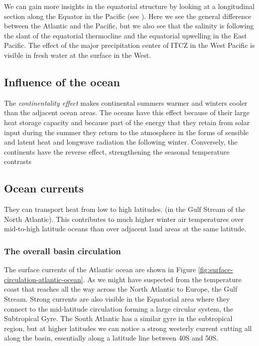 We can gain more insights in the equatorial structure by looking at a
longitudinal section along the Equator in the Pacific (see \fig{\ref{fig:salinity-vertical-equator}}). Here we see the general difference between the
Atlantic and the Pacific, but we also see that the salinity is following
the slant of the equatorial thermocline and the equatorial upwelling in
the East Pacific. The effect of the major precipitation center of ITCZ
in the West Pacific is visible in fresh water at the surface in the
West.

\subsection{Influence of the ocean}\label{subsec:ocean-influence}

The \emph{continentality effect} makes continental summers warmer and winters cooler than the adjacent ocean areas.
The oceans have this effect because of their large heat storage capacity and because part of the energy that they retain from
solar input during the summer they return to the atmosphere in the forms of sensible and latent heat and longwave radiation the following winter.
Conversely, the continents have the reverse effect, strengthening the seasonal temperature contrasts

\subsection{Ocean currents}\label{subsec:ocean-currents}

They can transport heat from low to high latitudes. (in the Gulf Stream of the North Atlantic). This contributes to much higher winter air temperatures over mid-to-high latitude oceans than over adjacent land areas at the same latitude.

\subsubsection{The overall basin circulation}\label{subsubsec:overall-basin-circulation}

The surface currents of the Atlantic ocean are shown in Figure \ref{fig:surface-circulation-atlantic-ocean}. As we might have suspected from the temperature coast that reaches all the way across the North Atlantic to Europe, the Gulf Stream. Strong currents are also visible in the Equatorial area
where they connect to the mid-latitude circulation forming a large circular system, the Subtropical Gyre. The South Atlantic has a similar gyre in the subtropical region, but at higher latitudes we can notice a strong westerly current cutting all along the basin, essentially along a latitude line between 40S and 50S.

